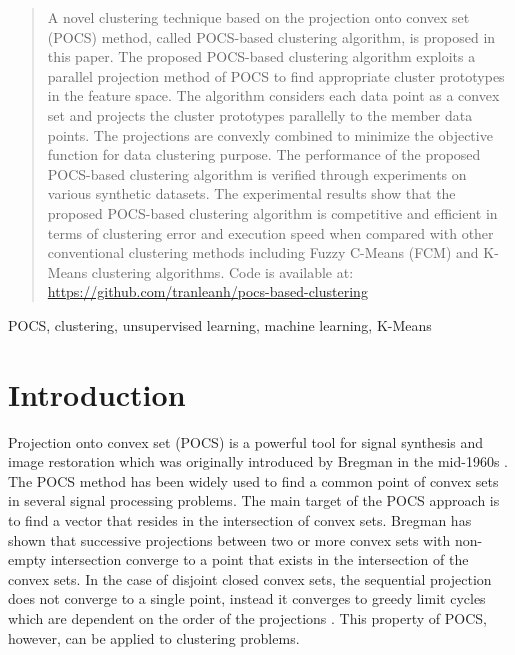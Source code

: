 \documentclass[conference]{IEEEtran}
\begin{document}
\maketitle

\begin{abstract}
A novel clustering technique based on the projection onto convex set (POCS) method, called POCS-based clustering algorithm, is proposed in this paper. The proposed POCS-based clustering algorithm exploits a parallel projection method of POCS to find appropriate cluster prototypes in the feature space. The algorithm considers each data point as a convex set and projects the cluster prototypes parallelly to the member data points. The projections are convexly combined to minimize the objective function for data clustering purpose. The performance of the proposed POCS-based clustering algorithm is verified through experiments on various synthetic datasets. The experimental results show that the proposed POCS-based clustering algorithm is competitive and efficient in terms of clustering error and execution speed when compared with other conventional clustering methods including Fuzzy C-Means (FCM) and K-Means clustering algorithms. Code is available at: \url{https://github.com/tranleanh/pocs-based-clustering} 
\end{abstract}

\begin{IEEEkeywords}
POCS, clustering, unsupervised learning, machine learning, K-Means
\end{IEEEkeywords}


\section{Introduction}

Projection onto convex set (POCS) is a powerful tool for signal synthesis and image restoration which was originally introduced by Bregman in the mid-1960s \cite{b1}. The POCS method has been widely used to find a common point of convex sets in several signal processing problems. The main target of the POCS approach is to find a vector that resides in the intersection of convex sets. Bregman has shown that successive projections between two or more convex sets with non-empty intersection converge to a point that exists in the intersection of the convex sets. In the case of disjoint closed convex sets, the sequential projection does not converge to a single point, instead it converges to greedy limit cycles which are dependent on the order of the projections \cite{b1}. This property of POCS, however, can be applied to clustering problems. 
\end{document}
